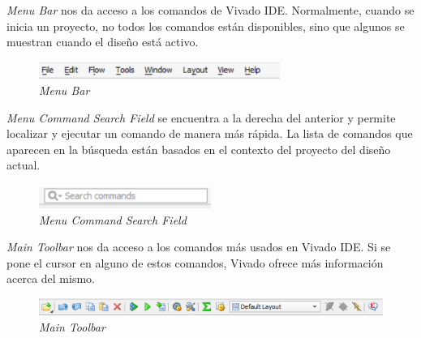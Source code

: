 \textit{Menu Bar} nos da acceso a los comandos de Vivado IDE. Normalmente, cuando se inicia un proyecto, no todos los comandos están 
disponibles, sino que algunos se muestran cuando el diseño está activo.

\begin{figure}[H]
    \centering
    \includegraphics[width = 0.7\textwidth]{imagenes/menubar.png}
    \caption{\textit{Menu Bar}}\label{menubar}
\end{figure}

\textit{Menu Command Search Field} se encuentra a la derecha del anterior y permite localizar y ejecutar un comando de manera más rápida. La 
lista de comandos que aparecen en la búsqueda están basados en el contexto del proyecto del diseño actual.

\begin{figure}[H]
    \centering
    \includegraphics[width = 0.5\textwidth]{imagenes/mcsf.png}
    \caption{\textit{Menu Command Search Field}}\label{mcsf}
\end{figure}

\textit{Main Toolbar} nos da acceso a los comandos más usados en Vivado IDE. Si se pone el cursor en alguno de estos comandos, Vivado 
ofrece más información acerca del mismo.

\begin{figure}[H]
    \centering
    \includegraphics[width = 1\textwidth]{imagenes/maintoolbar.png}
    \caption{\textit{Main Toolbar}}\label{maintoolbar}
\end{figure}

